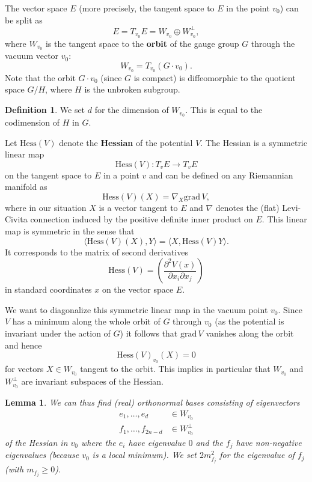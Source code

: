 \documentclass[12pt]{amsart}
\newtheorem{lem}[thm]{Lemma}
\theoremstyle{definition}
\newtheorem{defn}[thm]{Definition}
\theoremstyle{remark}
\numberwithin{equation}{section}
\begin{document}
The vector space $E$ (more precisely, the tangent space to $E$ in the point $v_0$) can be split as 
\begin{equation*}
E=T_{v_0}E=W_{v_0}\oplus W_{v_0}^\perp,
\end{equation*} 
where $W_{v_0}$ is the tangent space to the {\bf orbit} of the gauge group $G$ through the vacuum vector $v_0$:
\begin{equation*}
W_{v_0}=T_{v_0}(G\cdot v_0).
\end{equation*}
Note that the orbit $G\cdot v_0$ (since $G$ is compact) is diffeomorphic to the quotient space $G/H$, where $H$ is the unbroken subgroup. 
\begin{defn}
We set $d$ for the dimension of $W_{v_0}$. This is equal to the codimension of $H$ in $G$.
\end{defn}

Let $\mathrm{Hess}(V)$ denote the {\bf Hessian} of the potential $V$. The Hessian is a symmetric linear map 
\begin{equation*}
\mathrm{Hess}(V)\colon T_vE\longrightarrow T_vE
\end{equation*}
on the tangent space to $E$ in a point $v$ and can be defined on any Riemannian manifold as
\begin{equation*}
\mathrm{Hess}(V)(X)=\nabla_X\mathrm{grad}\,V,
\end{equation*} 
where in our situation $X$ is a vector tangent to $E$ and $\nabla$ denotes the (flat) Levi-Civita connection induced by the positive definite inner product on $E$. This linear map is symmetric in the sense that 
\begin{equation*}
\langle \mathrm{Hess}(V)(X),Y\rangle = \langle X,\mathrm{Hess}(V)Y\rangle.
\end{equation*} 
It corresponds to the matrix of second derivatives 
\begin{equation*}
\mathrm{Hess}(V)=\left(\frac{\partial^2V(x)}{\partial x_i\partial x_j}\right)
\end{equation*}
in standard coordinates $x$ on the vector space $E$.

We want to diagonalize this symmetric linear map in the vacuum point $v_0$. Since $V$ has a minimum along the whole orbit of $G$ through $v_0$ (as the potential is invariant under the action of $G$) it follows that $\mathrm{grad}\,V$ vanishes along the orbit and hence
\begin{equation*}
\mathrm{Hess}(V)_{v_0}(X)=0
\end{equation*}
for vectors $X\in W_{v_0}$ tangent to the orbit. This implies in particular that $W_{v_0}$ and $W_{v_0}^\perp$ are invariant subspaces of the Hessian.
\begin{lem}
We can thus find (real) orthonormal bases consisting of eigenvectors \begin{align*}
e_1,\ldots,e_d&\in W_{v_0}\\
f_1,\ldots,f_{2n-d}&\in W_{v_0}^\perp
\end{align*}
of the Hessian in $v_0$ where the $e_i$ have eigenvalue $0$ and the $f_j$ have non-negative eigenvalues (because $v_0$ is a local minimum). We set $2m_{f_j}^2$ for the eigenvalue of $f_j$ (with $m_{f_j}\geq 0$).
\end{lem}
\end{document}
